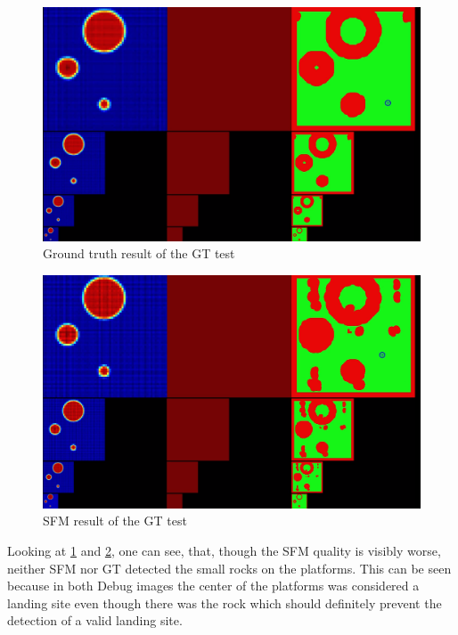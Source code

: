 \begin{figure}[ht]
\centering
\includegraphics[scale=0.14]{images/methodology/GT.png}
\caption{Ground truth result of the GT test}
\label{fig:gt_test_gt} %
\end{figure}

\begin{figure}[ht]
\centering
\includegraphics[scale=0.14]{images/methodology/SFM.png}
\caption{SFM result of the GT test}
\label{fig:gt_test_sfm}
\end{figure} %

Looking at \cref{fig:gt_test_gt} and \cref{fig:gt_test_sfm}, one can see, that, though the SFM quality is visibly worse, neither SFM nor GT detected the small rocks on the platforms. This can be seen because in both Debug images the center of the platforms was considered a landing site even though there was the rock which should definitely prevent the detection of a valid landing site.

